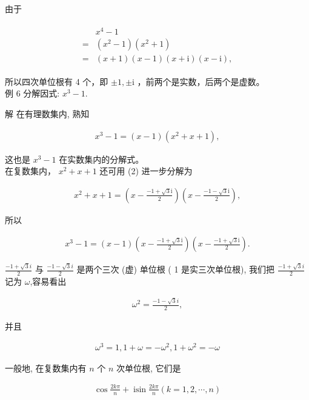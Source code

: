 \documentclass[10pt]{article}
\begin{document}
由于

\begin{align*}
\begin{aligned}
& x^{4}-1 \\
= & \left(x^{2}-1\right)\left(x^{2}+1\right) \\
= & (x+1)(x-1)(x+\mathrm{i})(x-\mathrm{i}),
\end{aligned}
\end{align*}

所以四次单位根有 4 个，即 $\pm 1, \pm \mathrm{i}$ ，前两个是实数，后两个是虚数。\\
例 6 分解因式: $x^{3}-1$.

解 在有理数集内, 熟知

\begin{align*}
x^{3}-1=(x-1)\left(x^{2}+x+1\right),
\end{align*}

这也是 $x^{3}-1$ 在实数集内的分解式。\\
在复数集内， $x^{2}+x+1$ 还可用 (2) 进一步分解为

\begin{align*}
x^{2}+x+1=\left(x-\frac{-1+\sqrt{3} \mathrm{i}}{2}\right)\left(x-\frac{-1-\sqrt{3} \mathrm{i}}{2}\right),
\end{align*}

所以

\begin{align*}
x^{3}-1=(x-1)\left(x-\frac{-1+\sqrt{3} \mathrm{i}}{2}\right)\left(x-\frac{-1+\sqrt{3} \mathrm{i}}{2}\right) .
\end{align*}

$\frac{-1+\sqrt{3} i}{2}$ 与 $\frac{-1-\sqrt{3} i}{2}$ 是两个三次 (虚) 单位根 ( 1 是实三次单位根), 我们把 $\frac{-1+\sqrt{3} i}{2}$ 记为 $\omega$,容易看出

\begin{align*}
\omega^{2}=\frac{-1-\sqrt{3} i}{2},
\end{align*}

并且

\begin{align*}
\omega^{3}=1,1+\omega=-\omega^{2}, 1+\omega^{2}=-\omega \tag{4}
\end{align*}

一般地, 在复数集内有 $n$ 个 $n$ 次单位根, 它们是

\begin{align*}
\cos \frac{2 k \pi}{n}+\operatorname{isin} \frac{2 k \pi}{n}(k=1,2, \cdots, n) \tag{5}
\end{align*}
\end{document}
